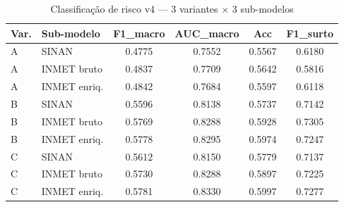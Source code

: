 \begin{table}[htbp]
\centering
\caption{Classificação de risco v4 --- 3 variantes $\times$ 3 sub-modelos}
\label{tab:v4-classification}
\small
\begin{tabular}{llcccc}
\toprule
Var. & Sub-modelo & F1\_macro & AUC\_macro & Acc & F1\_surto \\
\midrule
    A & SINAN & 0.4775 & 0.7552 & 0.5567 & 0.6180 \\
    A & INMET bruto & 0.4837 & 0.7709 & 0.5642 & 0.5816 \\
    A & INMET enriq. & 0.4842 & 0.7684 & 0.5597 & 0.6118 \\
    B & SINAN & 0.5596 & 0.8138 & 0.5737 & 0.7142 \\
    B & INMET bruto & 0.5769 & 0.8288 & 0.5928 & 0.7305 \\
    B & INMET enriq. & 0.5778 & 0.8295 & 0.5974 & 0.7247 \\
    C & SINAN & 0.5612 & 0.8150 & 0.5779 & 0.7137 \\
    C & INMET bruto & 0.5730 & 0.8288 & 0.5897 & 0.7225 \\
    C & INMET enriq. & 0.5781 & 0.8330 & 0.5997 & 0.7277 \\
\bottomrule
\end{tabular}
\end{table}

